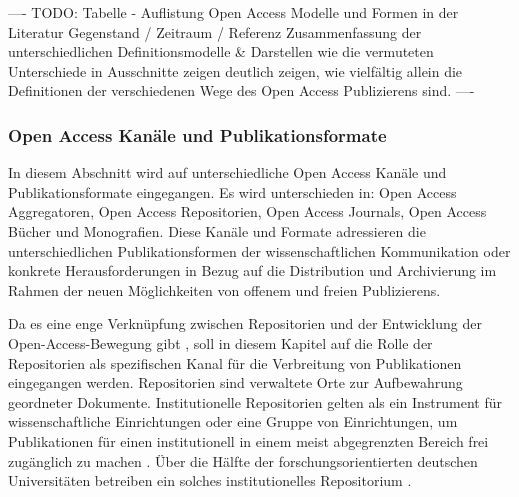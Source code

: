 ---- TODO: Tabelle - Auflistung Open Access  Modelle und Formen in der Literatur
Gegenstand / Zeitraum / Referenz
Zusammenfassung der unterschiedlichen Definitionsmodelle & Darstellen wie die vermuteten Unterschiede in Ausschnitte zeigen deutlich zeigen, wie vielfältig allein die Definitionen der verschiedenen Wege des Open Access Publizierens sind. ----

\subsubsection{Open Access Kanäle und Publikationsformate}

In diesem Abschnitt wird auf unterschiedliche Open Access Kanäle und Publikationsformate eingegangen. Es wird unterschieden in: Open Access Aggregatoren, Open Access Repositorien, Open Access Journals, Open Access Bücher und Monografien. Diese Kanäle und Formate adressieren die unterschiedlichen Publikationsformen der wissenschaftlichen Kommunikation oder konkrete Herausforderungen in Bezug auf die Distribution und Archivierung im Rahmen der neuen Möglichkeiten von offenem und freien Publizierens.

Da es eine enge Verknüpfung zwischen Repositorien und der Entwicklung der Open-Access-Bewegung gibt \cite{adema_2013_political} \cite{offhaus_2012_institutionelle_repos}, soll in diesem Kapitel auf die Rolle der Repositorien als spezifischen Kanal für die Verbreitung von Publikationen eingegangen werden. Repositorien sind verwaltete Orte zur Aufbewahrung geordneter Dokumente. Institutionelle Repositorien gelten als ein Instrument für wissenschaftliche Einrichtungen oder eine Gruppe von Einrichtungen, um Publikationen für einen institutionell in einem meist abgegrenzten Bereich frei zugänglich zu machen \cite{dobratz_2007_open} \cite{Baggs_2006}. Über die Hälfte der forschungsorientierten deutschen Universitäten betreiben ein solches institutionelles Repositorium \cite{Schmidt_2009}.

